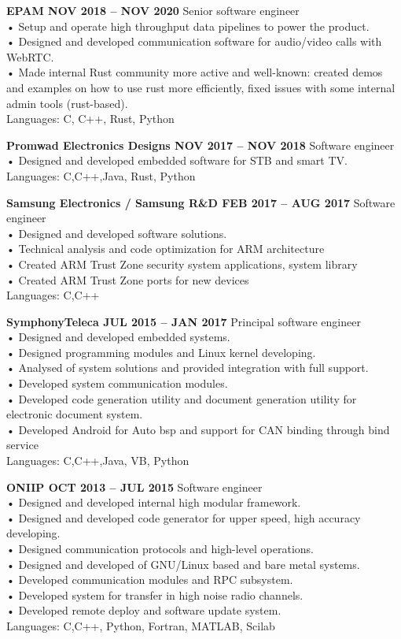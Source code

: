 \documentclass{article}
\begin{document}
\bigskip\noindent
\textbf{EPAM NOV 2018 -- NOV 2020}
Senior software engineer\\
• Setup and operate high throughput data pipelines to power the product.\\
• Designed and developed communication software for audio/video calls with WebRTC.\\
• Made internal Rust community more active and well-known: created demos and examples on how to use rust
more efficiently, fixed issues with some internal admin tools (rust-based).\\
Languages: C, C++, Rust, Python

\bigskip\noindent
\textbf{Promwad Electronics Designs NOV 2017 -- NOV 2018}
Software engineer\\
• Designed and developed embedded software for STB and smart TV.\\
Languages: C,C++,Java, Rust, Python

\bigskip\noindent
\textbf{Samsung Electronics / Samsung R\&D FEB 2017 -- AUG 2017}
Software engineer\\
• Designed and developed software solutions.\\
• Technical analysis and code optimization for ARM architecture\\
• Created ARM Trust Zone security system applications, system library\\
• Created ARM Trust Zone ports for new devices\\
Languages: C,C++

\bigskip\noindent
\textbf{SymphonyTeleca JUL 2015 -- JAN 2017}
Principal software engineer\\
• Designed and developed embedded systems.\\
• Designed programming modules and Linux kernel developing.\\
• Analysed of system solutions and provided integration with full support.\\
• Developed system communication modules.\\
• Developed code generation utility and document generation utility for electronic document system.\\
• Developed Android for Auto bsp and support for CAN binding through bind service\\
Languages: C,C++,Java, VB, Python

\bigskip\noindent
\textbf{ONIIP OCT 2013 -- JUL 2015}
Software engineer\\
• Designed and developed internal high modular framework.\\
• Designed and developed code generator for upper speed, high accuracy developing.\\
• Designed communication protocols and high-level operations.\\
• Designed and developed of GNU/Linux based and bare metal systems.\\
• Developed communication modules and RPC subsystem.\\
• Developed system for transfer in high noise radio channels.\\
• Developed remote deploy and software update system.\\
Languages: C,C++, Python, Fortran, MATLAB, Scilab
\end{document}
